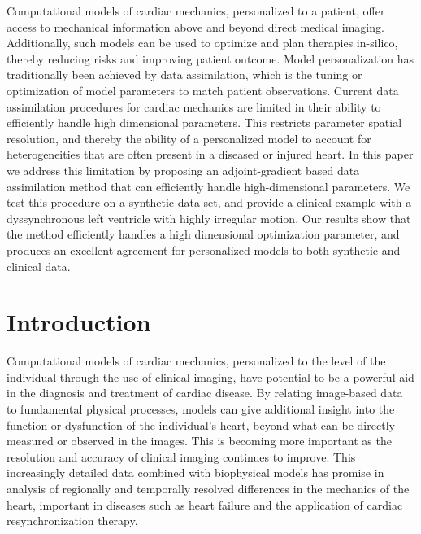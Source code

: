 
Computational models of cardiac mechanics, personalized to a patient, offer access 
to mechanical information above and beyond direct medical imaging.
Additionally, such models
can be used to optimize and plan therapies in-silico, thereby reducing risks and
improving patient outcome. Model personalization has traditionally been achieved by data
assimilation, which is the tuning or optimization of model parameters
to match patient observations.
Current data assimilation procedures for cardiac mechanics are limited in their ability
to efficiently handle high dimensional parameters.
This restricts parameter spatial resolution, and thereby the ability
of a personalized model to account for heterogeneities that are often present in
a diseased or injured heart.
In this paper we address this limitation by
proposing an adjoint-gradient based data assimilation method
that can efficiently handle high-dimensional
parameters. We test this procedure on a synthetic data set,
and provide a clinical example with
a dyssynchronous left ventricle with highly irregular motion.
Our results show that the method efficiently handles a high dimensional
optimization parameter, and produces an excellent agreement
for personalized models to both synthetic and clinical data.


\clearpage
\section{Introduction}
Computational models of cardiac mechanics, personalized to the level of the individual 
through the use of clinical imaging, have potential to be a powerful aid in the diagnosis and 
treatment of cardiac disease.  By relating image-based data to fundamental physical 
processes, models can give additional insight into the function or dysfunction of the 
individual's heart, beyond what can be directly measured or observed in the images. 
This is becoming more important as the resolution and accuracy of clinical imaging continues to 
improve.  This increasingly detailed data combined with biophysical models has promise 
in analysis of regionally and temporally resolved differences in the mechanics of the heart, 
important in diseases such as heart failure and the application of cardiac resynchronization therapy. 

